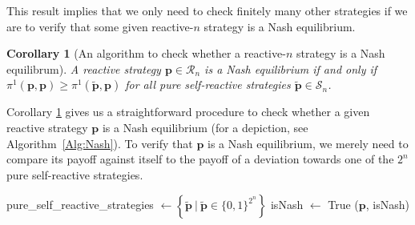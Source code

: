 \documentclass[11pt]{article}
\theoremstyle{plainCl1}
\newtheorem{corollary}{Corollary}
\theoremstyle{plainCl2}
\begin{document}
\noindent
This result implies that we only need to check finitely many other strategies if we are to verify that some given reactive-$n$ strategy is a Nash equilibrium. 

\begin{corollary}[An algorithm to check whether a reactive-$n$ strategy is a Nash equilibrum]
\label{Cor:NashCondition}
A reactive strategy $\mathbf{p}\!\in\!\mathcal{R}_n$ is a Nash equilibrium if and only if $\pi^1(\mathbf{p},\mathbf{p}) \!\ge\! \pi^1(\mathbf{\tilde p},\mathbf{p})$ for all pure self-reactive strategies $\mathbf{\tilde p}\!\in\!\mathcal{S}_n$. 
\end{corollary}

\noindent
Corollary \ref{Cor:NashCondition} gives us a straightforward procedure to check whether a given reactive strategy $\mathbf{p}$ is a Nash equilibrium (for a depiction, see Algorithm~\ref{Alg:Nash}). To verify that $\mathbf{p}$ is a Nash equilibrium, we merely need to compare its payoff against itself to the payoff of a deviation towards one of the $2^n$ pure self-reactive strategies.\\

\begin{algorithm}[t!]
      pure\_self\_reactive\_strategies $\gets \left\{ \mathbf{\tilde{p}} ~\big|~ \mathbf{\tilde{p}} \in \{0, 1\}^{2 ^ n} \right\}$ \;
      isNash $\gets$ True \; 
      \Return (\(\mathbf{p}\), isNash) \;
  \caption{An algorithm to verify whether a given reactive strategy~$\mathbf{p}$ is a Nash equilibrium.}
  \label{Alg:Nash}
\end{algorithm}


\end{document}
